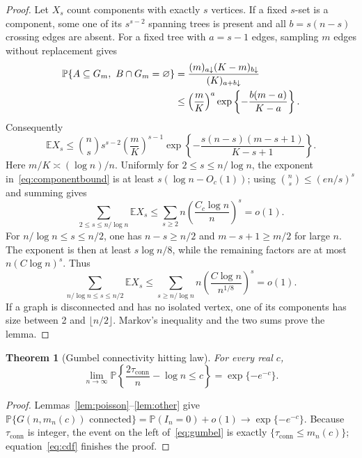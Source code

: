 \documentclass[10pt]{article}
\newtheorem{theorem}{Theorem}
\newcommand{\E}{\mathbb E}
\newcommand{\Pp}{\mathbb P}
\newcommand{\conn}{\mathrm{conn}}
\newcommand{\fall}[2]{(#1)_{#2\downarrow}}
\begin{document}
\begin{proof}
Let $X_s$ count components with exactly $s$ vertices.  If a fixed $s$-set is
a component, some one of its $s^{s-2}$ spanning trees is present and all
$b=s(n-s)$ crossing edges are absent.  For a fixed tree with $a=s-1$ edges,
sampling $m$ edges without replacement gives
\begin{align}
 \Pp\{A\subseteq G_m,\ B\cap G_m=\varnothing\}
 &=\frac{\fall{m}{a}\fall{K-m}{b}}{\fall{K}{a+b}}\notag\\
 &\leq\left(\frac mK\right)^a
 \exp\left\{-\frac{b(m-a)}{K-a}\right\}.
\end{align}
Consequently
\begin{equation}\label{eq:componentbound}
 \E X_s\leq\binom ns s^{s-2}\left(\frac mK\right)^{s-1}
 \exp\left\{-\frac{s(n-s)(m-s+1)}{K-s+1}\right\}.
\end{equation}
Here $m/K\asymp(\log n)/n$.  Uniformly for
$2\leq s\leq n/\log n$, the exponent in~\eqref{eq:componentbound} is at
least $s(\log n-O_c(1))$; using $\binom ns\leq(en/s)^s$ and summing gives
\[
 \sum_{2\leq s\leq n/\log n}\E X_s
 \leq\sum_{s\geq2}n\left(\frac{C_c\log n}{n}\right)^s=o(1).
\]
For $n/\log n\leq s\leq n/2$, one has $n-s\geq n/2$ and
$m-s+1\geq m/2$ for large $n$.  The exponent is then at least
$s\log n/8$, while the remaining factors are at most
$n(C\log n)^s$.  Thus
\[
 \sum_{n/\log n\leq s\leq n/2}\E X_s
 \leq\sum_{s\geq n/\log n}n
       \left(\frac{C\log n}{n^{1/8}}\right)^s=o(1).
\]
If a graph is disconnected and has no isolated vertex, one of its components
has size between 2 and $\lfloor n/2\rfloor$.  Markov's inequality and the two
sums prove the lemma.
\end{proof}

\begin{theorem}[Gumbel connectivity hitting law]\label{thm:gumbel}
For every real $c$,
\begin{equation}\label{eq:gumbel}
 \lim_{n\to\infty}\Pp\left\{\frac{2\tau_{\conn}}n-\log n\leq c\right\}
 =\exp\{-e^{-c}\}.
\end{equation}
\end{theorem}

\begin{proof}
Lemmas~\ref{lem:poisson}--\ref{lem:other} give
$\Pp\{G(n,m_n(c))\text{ connected}\}=\Pp(I_n=0)+o(1)
\to\exp\{-e^{-c}\}$.  Because $\tau_{\conn}$ is integer,
the event on the left of~\eqref{eq:gumbel} is exactly
$\{\tau_{\conn}\leq m_n(c)\}$; equation~\eqref{eq:cdf} finishes the proof.
\end{proof}
\fi
\end{document}

